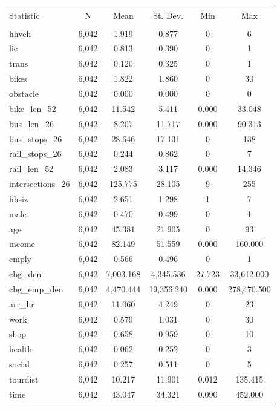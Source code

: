 \documentclass{article}
\begin{document}
	\begin{table}[!htbp] \centering 
		\caption{} 
		\label{} 
		\begin{tabular}{@{\extracolsep{5pt}}lccccc} 
			\\[-1.8ex]\hline 
			\hline \\[-1.8ex] 
			Statistic & \multicolumn{1}{c}{N} & \multicolumn{1}{c}{Mean} & \multicolumn{1}{c}{St. Dev.} & \multicolumn{1}{c}{Min} & \multicolumn{1}{c}{Max} \\ 
			\hline \\[-1.8ex] 
			hhveh & 6,042 & 1.919 & 0.877 & 0 & 6 \\ 
			lic & 6,042 & 0.813 & 0.390 & 0 & 1 \\ 
			trans & 6,042 & 0.120 & 0.325 & 0 & 1 \\ 
			bikes & 6,042 & 1.822 & 1.860 & 0 & 30 \\ 
			obstacle & 6,042 & 0.000 & 0.000 & 0 & 0 \\ 
			bike\_len\_52 & 6,042 & 11.542 & 5.411 & 0.000 & 33.048 \\ 
			bus\_len\_26 & 6,042 & 8.207 & 11.717 & 0.000 & 90.313 \\ 
			bus\_stops\_26 & 6,042 & 28.646 & 17.131 & 0 & 138 \\ 
			rail\_stops\_26 & 6,042 & 0.244 & 0.862 & 0 & 7 \\ 
			rail\_len\_52 & 6,042 & 2.083 & 3.117 & 0.000 & 14.346 \\ 
			intersections\_26 & 6,042 & 125.775 & 28.105 & 9 & 255 \\ 
			hhsiz & 6,042 & 2.651 & 1.298 & 1 & 7 \\ 
			male & 6,042 & 0.470 & 0.499 & 0 & 1 \\ 
			age & 6,042 & 45.381 & 21.905 & 0 & 93 \\ 
			income & 6,042 & 82.149 & 51.559 & 0.000 & 160.000 \\ 
			emply & 6,042 & 0.566 & 0.496 & 0 & 1 \\ 
			cbg\_den & 6,042 & 7,003.168 & 4,345.536 & 27.723 & 33,612.000 \\ 
			cbg\_emp\_den & 6,042 & 4,470.444 & 19,356.240 & 0.000 & 278,470.500 \\ 
			arr\_hr & 6,042 & 11.060 & 4.249 & 0 & 23 \\ 
			work & 6,042 & 0.579 & 1.031 & 0 & 30 \\ 
			shop & 6,042 & 0.658 & 0.959 & 0 & 10 \\ 
			health & 6,042 & 0.062 & 0.252 & 0 & 3 \\ 
			social & 6,042 & 0.257 & 0.511 & 0 & 5 \\ 
			tourdist & 6,042 & 10.217 & 11.901 & 0.012 & 135.415 \\ 
			time & 6,042 & 43.047 & 34.321 & 0.090 & 452.000 \\ 
			\hline \\[-1.8ex] 
		\end{tabular} 
	\end{table} 
\end{document}
